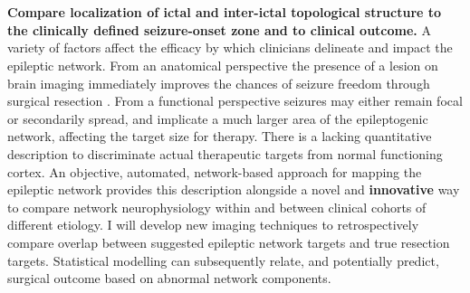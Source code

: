 ~\\
~\\
 \textbf{Compare localization of ictal and inter-ictal topological structure to the clinically defined seizure-onset zone and to clinical outcome.}
A variety of factors affect the efficacy by which clinicians delineate and impact the epileptic network. From an anatomical perspective the presence of a lesion on brain imaging immediately improves the chances of seizure freedom through surgical resection \cite{french2007refractory}. From a functional perspective seizures may either remain focal or secondarily spread, and implicate a much larger area of the epileptogenic network, affecting the target size for therapy. There is a lacking quantitative description to discriminate actual therapeutic targets from normal functioning cortex. An objective, automated, network-based approach for mapping the epileptic network provides this description alongside a novel and \textbf{innovative} way to compare network neurophysiology within and between clinical cohorts of different etiology. I will develop new imaging techniques to retrospectively compare overlap between suggested epileptic network targets and true resection targets. Statistical modelling can subsequently relate, and potentially predict, surgical outcome based on abnormal network components.

